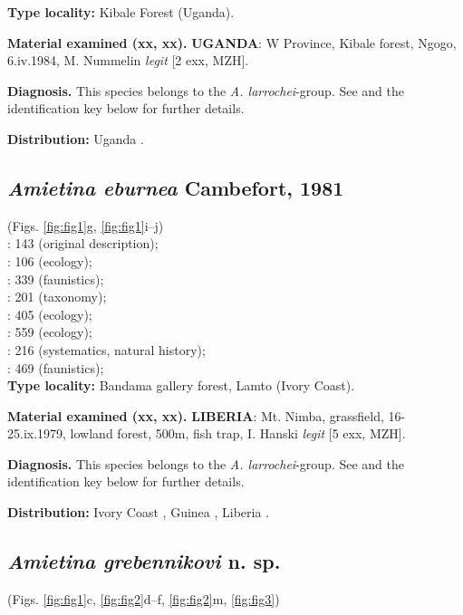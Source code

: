 \documentclass[fleqn,10pt,lineno]{wlpeerj}
\begin{document}
\textbf{Type locality:} Kibale Forest (Uganda).

\textbf{Material examined (xx\male\male, xx\female\female).} \textbf{UGANDA}: W Province, Kibale forest, Ngogo, 6.iv.1984, M. Nummelin \textit{legit} [2 exx, MZH].

\textbf{Diagnosis.} This species belongs to the \textit{A. larrochei}-group. See \citep{branco1988deux} and the identification key below for further details.

\textbf{Distribution:} Uganda \citep{branco1988deux}.

\subsection*{\textbf{\textit{Amietina eburnea} Cambefort, 1981}}
(Figs. \ref{fig:fig1}g, \ref{fig:fig1}i--j) \\
\cite{cambefort1981amietina}: 143 (original description);\\
\cite{cambefort1984etude}: 106 (ecology);\\
\cite{cambefort1985coleopteres}: 339 (faunistics);\\
\cite{branco1988deux}: 201 (taxonomy);\\
\cite{cambefort1991dung}: 405 (ecology);\\
\cite{cambefort2003nimba}: 559 (ecology);\\
\cite{davis2008african}: 216 (systematics, natural history);\\
\cite{moretto2010bayanga}: 469 (faunistics);\\

\textbf{Type locality:} Bandama gallery forest, Lamto (Ivory Coast).

\textbf{Material examined (xx\male\male, xx\female\female).} \textbf{LIBERIA}: Mt. Nimba, grassfield, 16-25.ix.1979, lowland forest, 500m, fish trap, I. Hanski \textit{legit} [5 exx, MZH].

\textbf{Diagnosis.} This species belongs to the \textit{A. larrochei}-group. See \citep{branco1988deux} and the identification key below for further details.

\textbf{Distribution:} Ivory Coast \citep{cambefort1981amietina}, Guinea \citep{cambefort2003nimba}, Liberia \citep{branco1988deux}.


\subsection*{\textbf{\textit{Amietina grebennikovi} n. sp.}}
(Figs. \ref{fig:fig1}c, \ref{fig:fig2}d--f, \ref{fig:fig2}m, \ref{fig:fig3})\\
\end{document}
